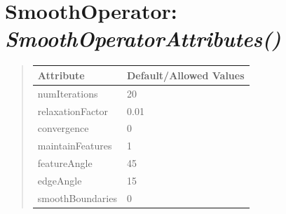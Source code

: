 \documentclass[letterpaper,10pt,english]{sphinxmanual}
\begin{document}
\begin{DUlineblock}{0em}
\item[] 
\end{DUlineblock}

\begin{DUlineblock}{0em}
\item[] 
\end{DUlineblock}


\section{\textbf{SmoothOperator}: \emph{SmoothOperatorAttributes()}}
\label{attributes:smoothoperator-smoothoperatorattributes}
\begin{DUlineblock}{0em}
\item[] 
\end{DUlineblock}
\begin{quote}

\begin{tabulary}{\linewidth}{|L|L|}
\hline

\textbf{Attribute}
 & 
\textbf{Default/Allowed Values}
\\
\hline
numIterations
 & 
20
\\
\hline
relaxationFactor
 & 
0.01
\\
\hline
convergence
 & 
0
\\
\hline
maintainFeatures
 & 
1
\\
\hline
featureAngle
 & 
45
\\
\hline
edgeAngle
 & 
15
\\
\hline
smoothBoundaries
 & 
0
\\
\hline\end{tabulary}

\end{quote}

\begin{DUlineblock}{0em}
\item[] 
\end{DUlineblock}

\begin{DUlineblock}{0em}
\item[] 
\end{DUlineblock}
\end{document}
